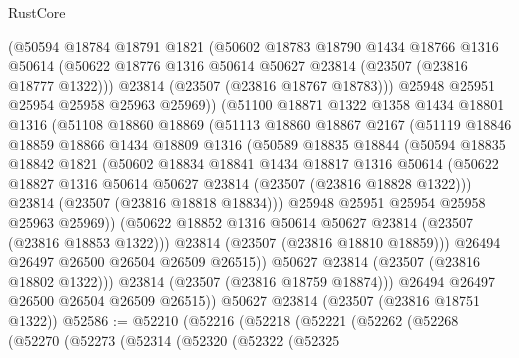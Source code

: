 \begin{lexlean}{RustCore}
\begin{coremodule}
            (@50594
              @18784
              @18791
              @1821
              (@50602
                @18783
                @18790
                @1434
                @18766
                @1316
                @50614
                (@50622 @18776 @1316 @50614 @50627 @23814 (@23507 (@23816 @18777 @1322)))
                @23814
                (@23507 (@23816 @18767 @18783)))
              @25948
              @25951
              @25954
              @25958
              @25963
              @25969))
          (@51100
            @18871
            @1322
            @1358
            @1434
            @18801
            @1316
            (@51108
              @18860
              @18869
              (@51113
                @18860
                @18867
                @2167
                (@51119
                  @18846
                  @18859
                  @18866
                  @1434
                  @18809
                  @1316
                  (@50589
                    @18835
                    @18844
                    (@50594
                      @18835
                      @18842
                      @1821
                      (@50602
                        @18834
                        @18841
                        @1434
                        @18817
                        @1316
                        @50614
                        (@50622 @18827 @1316 @50614 @50627 @23814 (@23507 (@23816 @18828 @1322)))
                        @23814
                        (@23507 (@23816 @18818 @18834)))
                      @25948
                      @25951
                      @25954
                      @25958
                      @25963
                      @25969))
                  (@50622 @18852 @1316 @50614 @50627 @23814 (@23507 (@23816 @18853 @1322)))
                  @23814
                  (@23507 (@23816 @18810 @18859)))
                @26494
                @26497
                @26500
                @26504
                @26509
                @26515))
            @50627
            @23814
            (@23507 (@23816 @18802 @1322)))
          @23814
          (@23507 (@23816 @18759 @18874)))
        @26494
        @26497
        @26500
        @26504
        @26509
        @26515))
    @50627
    @23814
    (@23507 (@23816 @18751 @1322))
@52586 := @52210
    (@52216
      (@52218
        (@52221
          (@52262
            (@52268
              (@52270
                (@52273
                  (@52314
                    (@52320
                      (@52322
                        (@52325

\end{coremodule}
\end{lexlean}
